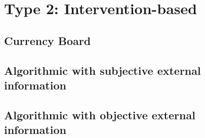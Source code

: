 \section{Type 2: Intervention-based}
\label{sec:t2}



\subsection{Currency Board}


\subsection{Algorithmic with subjective external information}

\subsection{Algorithmic with objective external information}

